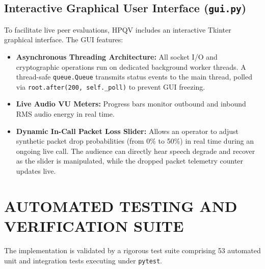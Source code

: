 \subsection{Interactive Graphical User Interface (\texttt{gui.py})}
To facilitate live peer evaluations, HPQV includes an interactive Tkinter graphical interface. The GUI features:
\begin{itemize}
    \item \textbf{Asynchronous Threading Architecture:} All socket I/O and cryptographic operations run on dedicated background worker threads. A thread-safe \texttt{queue.Queue} transmits status events to the main thread, polled via \texttt{root.after(200, self.\_poll)} to prevent GUI freezing.
    \item \textbf{Live Audio VU Meters:} Progress bars monitor outbound and inbound RMS audio energy in real time.
    \item \textbf{Dynamic In-Call Packet Loss Slider:} Allows an operator to adjust synthetic packet drop probabilities (from 0\% to 50\%) in real time during an ongoing live call. The audience can directly hear speech degrade and recover as the slider is manipulated, while the dropped packet telemetry counter updates live.
\end{itemize}

\section{AUTOMATED TESTING AND VERIFICATION SUITE}
The implementation is validated by a rigorous test suite comprising 53 automated unit and integration tests executing under \texttt{pytest}.

